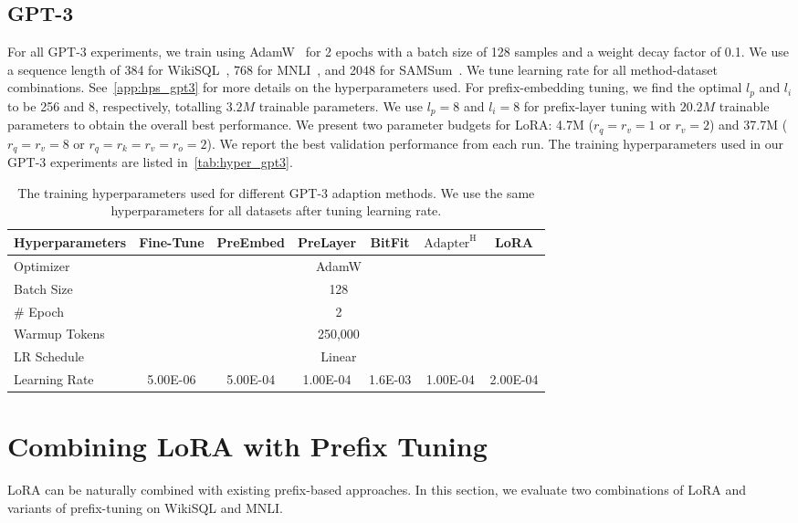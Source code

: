 \subsection{GPT-3}
\label{app:hps_gpt3}
For all GPT-3 experiments, we train using AdamW~\citep{loshchilov2017decoupled} for 2 epochs with a batch size of 128 samples and a weight decay factor of 0.1.
We use a sequence length of 384 for WikiSQL~\citep{DBLP:journals/corr/abs-1709-00103}, 768 for MNLI~\citep{williams-etal-2018-broad}, and 2048 for SAMSum~\citep{DBLP:journals/corr/abs-1911-12237}.
We tune learning rate for all method-dataset combinations.
See~\autoref{app:hps_gpt3} for more details on the hyperparameters used.
For prefix-embedding tuning, we find the optimal $l_p$ and $l_i$ to be 256 and 8, respectively, totalling $3.2M$ trainable parameters. 
We use $l_p=8$ and $l_i=8$ for prefix-layer tuning with $20.2M$ trainable parameters to obtain the overall best performance.
We present two parameter budgets for LoRA: 4.7M ($r_q=r_v=1$ or $r_{v}=2$) and 37.7M ($r_q=r_v=8$ or $r_q=r_k=r_v=r_o=2$).
We report the best validation performance from each run.
The training hyperparameters used in our GPT-3 experiments are listed in~\autoref{tab:hyper_gpt3}.
\begin{table}[h]
\centering
\begin{tabular}{l|cccccc}
\hline
\toprule
Hyperparameters & Fine-Tune & PreEmbed & PreLayer & BitFit & $\text{Adapter}^\text{H}$ & LoRA \\
\midrule
Optimizer & \multicolumn{6}{c}{AdamW} \\
Batch Size   & \multicolumn{6}{c}{128} \\
\# Epoch & \multicolumn{6}{c}{2} \\
Warmup Tokens & \multicolumn{6}{c}{250,000} \\
LR Schedule & \multicolumn{6}{c}{Linear} \\
\midrule
Learning Rate & 5.00E-06 & 5.00E-04 & 1.00E-04 & 1.6E-03 & 1.00E-04 & 2.00E-04 \\

\bottomrule
\end{tabular}
\caption{The training hyperparameters used for different GPT-3 adaption methods. We use the same hyperparameters for all datasets after tuning learning rate.}
\label{tab:hyper_gpt3}
\end{table}


\section{Combining LoRA with Prefix Tuning}
\label{app:lora_plus}
LoRA can be naturally combined with existing prefix-based approaches.
In this section, we evaluate two combinations of LoRA and variants of prefix-tuning on WikiSQL and MNLI.


